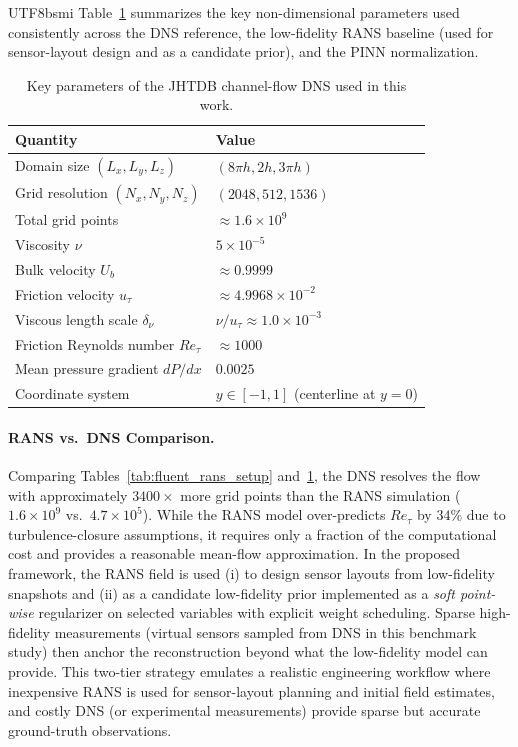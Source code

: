 \documentclass[master]{NTHUthesis}
\begin{document}
\begin{CJK*}{UTF8}{bsmi}
Table~\ref{tab:jhtdb_params} summarizes the key non-dimensional parameters used consistently across the DNS reference, the low-fidelity RANS baseline (used for sensor-layout design and as a candidate prior), and the PINN normalization.

\begin{table}[htbp]
    \centering
    \caption{Key parameters of the JHTDB channel-flow DNS used in this work.}
    \label{tab:jhtdb_params}
    \begin{tabular}{ll}
    \toprule
    \textbf{Quantity} & \textbf{Value} \\
    \midrule
    Domain size $(L_x,L_y,L_z)$ & $(8\pi h, 2h, 3\pi h)$ \\
    Grid resolution $(N_x, N_y, N_z)$ & $(2048, 512, 1536)$ \\
    Total grid points & $\approx 1.6 \times 10^9$ \\
    Viscosity $\nu$ & $5\times 10^{-5}$ \\
    Bulk velocity $U_b$ & $\approx 0.9999$ \\
    Friction velocity $u_\tau$ & $\approx 4.9968\times 10^{-2}$ \\
    Viscous length scale $\delta_\nu$ & $\nu/u_\tau \approx 1.0\times 10^{-3}$ \\
    Friction Reynolds number $Re_\tau$ & $\approx 1000$ \\
    Mean pressure gradient $dP/dx$ & $0.0025$ \\
    Coordinate system & $y \in [-1, 1]$ (centerline at $y=0$) \\
    \bottomrule
    \end{tabular}
\end{table}

\paragraph{RANS vs.\ DNS Comparison.}
Comparing Tables~\ref{tab:fluent_rans_setup} and~\ref{tab:jhtdb_params}, the DNS resolves the flow with approximately $3400\times$ more grid points than the RANS simulation ($1.6\times10^9$ vs.\ $4.7\times10^5$). 
While the RANS model over-predicts $Re_\tau$ by $34\%$ due to turbulence-closure assumptions, it requires only a fraction of the computational cost and provides a reasonable mean-flow approximation. 
In the proposed framework, the RANS field is used (i) to design sensor layouts from low-fidelity snapshots and (ii) as a candidate low-fidelity prior implemented as a \emph{soft point-wise} regularizer on selected variables with explicit weight scheduling. Sparse high-fidelity measurements (virtual sensors sampled from DNS in this benchmark study) then anchor the reconstruction beyond what the low-fidelity model can provide.
This two-tier strategy emulates a realistic engineering workflow where inexpensive RANS is used for sensor-layout planning and initial field estimates, and costly DNS (or experimental measurements) provide sparse but accurate ground-truth observations.


\end{CJK*}
\end{document}
